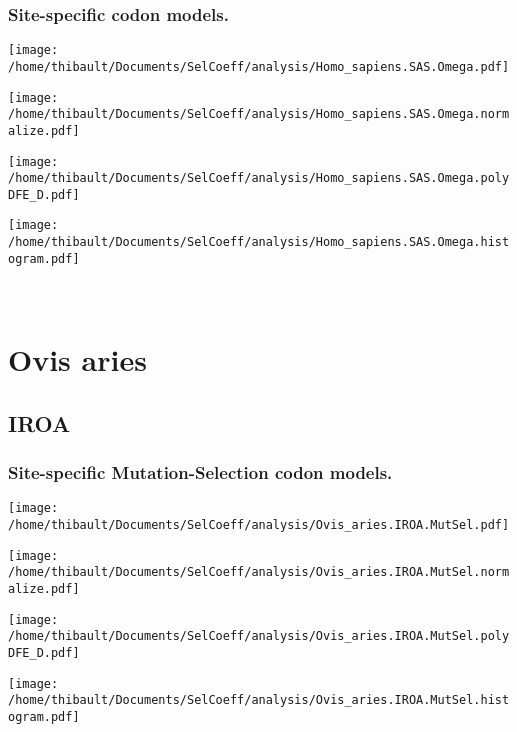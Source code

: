 \subsubsection*{Site-specific codon models.} 
\begin{minipage}{0.49\linewidth} 
\texttt{[image: /home/thibault/Documents/SelCoeff/analysis/Homo\_sapiens.SAS.Omega.pdf]} 
\end{minipage}
\begin{minipage}{0.49\linewidth} 
\texttt{[image: /home/thibault/Documents/SelCoeff/analysis/Homo\_sapiens.SAS.Omega.normalize.pdf]} 
\end{minipage}
\begin{minipage}{0.49\linewidth} 
\texttt{[image: /home/thibault/Documents/SelCoeff/analysis/Homo\_sapiens.SAS.Omega.polyDFE\_D.pdf]} 
\end{minipage}
\begin{minipage}{0.49\linewidth} 
\texttt{[image: /home/thibault/Documents/SelCoeff/analysis/Homo\_sapiens.SAS.Omega.histogram.pdf]} 
\end{minipage}
\\ 
\section{Ovis aries} 
 
\subsection{IROA} 
 
\subsubsection*{Site-specific Mutation-Selection codon models.} 
\begin{minipage}{0.49\linewidth} 
\texttt{[image: /home/thibault/Documents/SelCoeff/analysis/Ovis\_aries.IROA.MutSel.pdf]} 
\end{minipage}
\begin{minipage}{0.49\linewidth} 
\texttt{[image: /home/thibault/Documents/SelCoeff/analysis/Ovis\_aries.IROA.MutSel.normalize.pdf]} 
\end{minipage}
\begin{minipage}{0.49\linewidth} 
\texttt{[image: /home/thibault/Documents/SelCoeff/analysis/Ovis\_aries.IROA.MutSel.polyDFE\_D.pdf]} 
\end{minipage}
\begin{minipage}{0.49\linewidth} 
\texttt{[image: /home/thibault/Documents/SelCoeff/analysis/Ovis\_aries.IROA.MutSel.histogram.pdf]} 
\end{minipage}
\\ 
